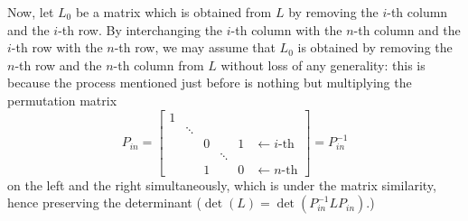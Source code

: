 \documentclass{homework}
\begin{document}
{Now, let $L_0$ be a matrix which is obtained from $L$ by removing the $i$-th column and the $i$-th row. By interchanging the $i$-th column with the $n$-th column and the $i$-th row with the $n$-th row, we may assume that $L_0$ is obtained by removing the $n$-th row and the $n$-th column from $L$ without loss of any generality: this is because the process mentioned just before is nothing but multiplying the permutation matrix
\[ P_{in} = \begin{bmatrix}
        1                                                    \\
         & \ddots                                            \\
         &        & 0 &        & 1 & \leftarrow\text{$i$-th} \\
         &        &   & \ddots                               \\
         &        & 1 &        & 0 & \leftarrow\text{$n$-th}
    \end{bmatrix} = P_{in}^{-1} \]
on the left and the right simultaneously, which is under the matrix similarity, hence preserving the determinant ($\det(L) = \det(P_{in}^{-1}LP_{in})$.)

}
\end{document}
